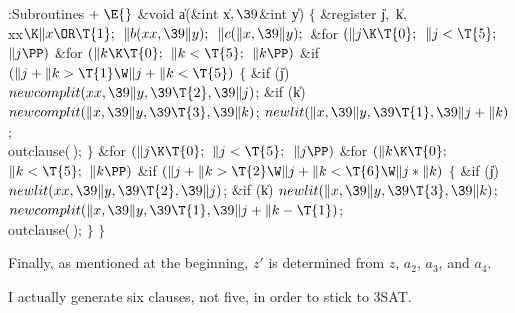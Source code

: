 \Y\B\4:Subroutines\X${}\mathrel+\E{}$\6
\&{void} \|a(\&{int} \|x${},\39{}$\&{int} \|y)\1\1\2\2\6
${}\{{}$\1\6
\&{register} \|j${},{}$ \|k${},{}$ \\{xx}${}\K\|x\OR\T{1};{}$\7
${}\|b(\\{xx},\39\|y);{}$\6
${}\|c(\|x,\39\|y);{}$\6
\&{for} ${}(\|j\K\T{0};{}$ ${}\|j<\T{5};{}$ ${}\|j\PP){}$\1\6
\&{for} ${}(\|k\K\T{0};{}$ ${}\|k<\T{5};{}$ ${}\|k\PP){}$\1\6
\&{if} ${}(\|j+\|k>\T{1}\W\|j+\|k<\T{5}){}$\5
${}\{{}$\1\6
\&{if} (\|j)\1\5
${}\\{newcomplit}(\\{xx},\39\|y,\39\T{2},\39\|j){}$;\2\6
\&{if} (\|k)\1\5
${}\\{newcomplit}(\|x,\39\|y,\39\T{3},\39\|k){}$;\2\6
${}\\{newlit}(\|x,\39\|y,\39\T{1},\39\|j+\|k){}$;\6
\\{outclause}(\,);\6
\4${}\}{}$\2\2\2\6
\&{for} ${}(\|j\K\T{0};{}$ ${}\|j<\T{5};{}$ ${}\|j\PP){}$\1\6
\&{for} ${}(\|k\K\T{0};{}$ ${}\|k<\T{5};{}$ ${}\|k\PP){}$\1\6
\&{if} ${}(\|j+\|k>\T{2}\W\|j+\|k<\T{6}\W\|j*\|k){}$\5
${}\{{}$\1\6
\&{if} (\|j)\1\5
${}\\{newlit}(\\{xx},\39\|y,\39\T{2},\39\|j){}$;\2\6
\&{if} (\|k)\1\5
${}\\{newlit}(\|x,\39\|y,\39\T{3},\39\|k){}$;\2\6
${}\\{newcomplit}(\|x,\39\|y,\39\T{1},\39\|j+\|k-\T{1}){}$;\6
\\{outclause}(\,);\6
\4${}\}{}$\2\2\2\6
\4${}\}{}$\2\par
\fi

Finally, as mentioned at the beginning, $z'$ is
determined
from $z$, $a_2$, $a_3$, and $a_4$.

I actually generate six clauses, not five, in order to stick to
{\mc 3SAT}.

